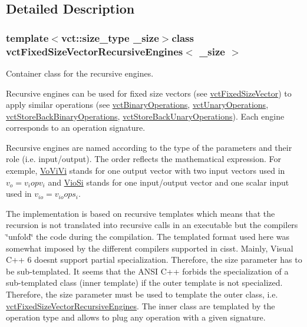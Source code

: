 \subsection{Detailed Description}
\subsubsection*{template$<$vct\+::size\+\_\+type \+\_\+size$>$class vct\+Fixed\+Size\+Vector\+Recursive\+Engines$<$ \+\_\+size $>$}

Container class for the recursive engines. 

Recursive engines can be used for fixed size vectors (see \hyperlink{classvct_fixed_size_vector}{vct\+Fixed\+Size\+Vector}) to apply similar operations (see \hyperlink{classvct_binary_operations}{vct\+Binary\+Operations}, \hyperlink{classvct_unary_operations}{vct\+Unary\+Operations}, \hyperlink{classvct_store_back_binary_operations}{vct\+Store\+Back\+Binary\+Operations}, \hyperlink{classvct_store_back_unary_operations}{vct\+Store\+Back\+Unary\+Operations}). Each engine corresponds to an operation signature.

Recursive engines are named according to the type of the parameters and their role (i.\+e. input/output). The order reflects the mathematical expression. For exemple, \hyperlink{classvct_fixed_size_vector_recursive_engines_1_1_vo_vi_vi}{Vo\+Vi\+Vi} stands for one output vector with two input vectors used in $v_o = v_i op v_i$ and \hyperlink{classvct_fixed_size_vector_recursive_engines_1_1_vio_si}{Vio\+Si} stands for one input/output vector and one scalar input used in $v_{io} = v_{io} op s_i$.

The implementation is based on recursive templates which means that the recursion is not translated into recursive calls in an executable but the compilers \char`\"{}unfold\char`\"{} the code during the compilation. The templated format used here was somewhat imposed by the different compilers supported in cisst. Mainly, Visual C++ 6 doesn\textquotesingle{}t support partial specialization. Therefore, the size parameter has to be sub-\/templated. It seems that the A\+N\+S\+I C++ forbids the specialization of a sub-\/templated class (inner template) if the outer template is not specialized. Therefore, the size parameter must be used to template the outer class, i.\+e. \hyperlink{classvct_fixed_size_vector_recursive_engines}{vct\+Fixed\+Size\+Vector\+Recursive\+Engines}. The inner class are templated by the operation type and allows to plug any operation with a given signature.

